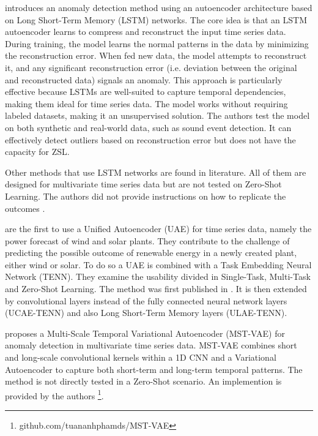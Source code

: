 \cite{provotar_unsupervised_2019} introduces an anomaly detection method using an autoencoder architecture based on Long Short-Term Memory (LSTM) networks. The core idea is that an LSTM autoencoder learns to compress and reconstruct the input time series data. During training, the model learns the normal patterns in the data by minimizing the reconstruction error. When fed new data, the model attempts to reconstruct it, and any significant reconstruction error (i.e. deviation between the original and reconstructed data) signals an anomaly. This approach is particularly effective because LSTMs are well-suited to capture temporal dependencies, making them ideal for time series data. The model works without requiring labeled datasets, making it an unsupervised solution. The authors test the model on both synthetic and real-world data, such as sound event detection. It can effectively detect outliers based on reconstruction error but does not have the capacity for ZSL.

Other methods that use LSTM networks are found in literature. All of them are designed for multivariate time series data but are not tested on Zero-Shot Learning. The authors did not provide instructions on how to replicate the outcomes
\cite{yokkampon_robust_2022} \cite{gao_tsmae_2023} \cite{niu_lstm-based_2020}.

\cite{nivarthi_multi-task_2023} are the first to use a Unified Autoencoder (UAE) for time series data, namely the power forecast of wind and solar plants. They contribute to the challenge of predicting the possible outcome of renewable energy in a newly created plant, either wind or solar. To do so a UAE is combined with a Task Embedding Neural Network (TENN). They examine the usability divided in Single-Task, Multi-Task and Zero-Shot Learning. The method was first published in \cite{nivarthi_unified_2022}. It is then extended by convolutional layers instead of the fully connected neural network layers (UCAE-TENN) and also Long Short-Term Memory layers (ULAE-TENN).

\cite{pham_mst-vae_2022} proposes a Multi-Scale Temporal Variational Autoencoder (MST-VAE) for anomaly detection in multivariate time series data. MST-VAE combines short and long-scale convolutional kernels within a 1D CNN and a Variational Autoencoder to capture both short-term and long-term temporal patterns. The method is not directly tested in a Zero-Shot scenario. An implemention is provided by the authors \footnote{\fussy\tiny github.com/tuananhphamds/MST-VAE}.

